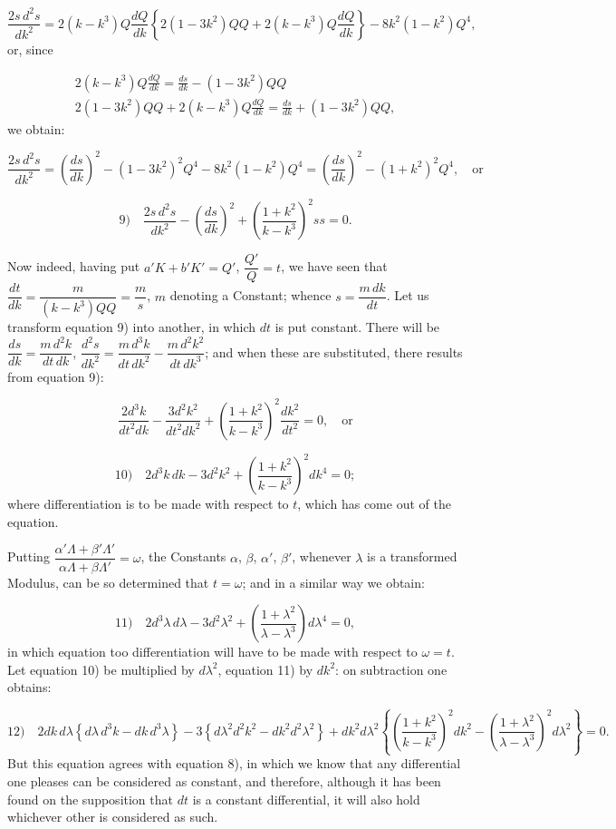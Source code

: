 \documentclass{article}
\begin{document}
\[
\frac{2s\,d^{2}s}{dk^{2}}=2(k-k^{3})Q\frac{dQ}{dk}\left\{2(1-3k^{2})QQ+2(k-k^{3})Q\frac{dQ}{dk}\right\}-8k^{2}(1-k^{2})Q^{4},
\]
or, since

\[
\begin{gathered}
2(k-k^{3})Q\frac{dQ}{dk}=\frac{ds}{dk}-(1-3k^{2})QQ\\[1.5ex]
2(1-3k^{2})QQ+2(k-k^{3})Q\frac{dQ}{dk}=\frac{ds}{dk}+(1-3k^{2})QQ,
\end{gathered}
\]
we obtain:

\[
\frac{2s\,d^{2}s}{dk^{2}}=\left(\frac{ds}{dk}\right)^{2}-(1-3k^{2})^{2}Q^{4}-8k^{2}(1-k^{2})Q^{4}=\left(\frac{ds}{dk}\right)^{2}-(1+k^{2})^{2}Q^{4},\quad\text{or}
\]

\[
\text{9)}\quad\frac{2s\,d^{2}s}{dk^{2}}-\left(\frac{ds}{dk}\right)^{2}+\left(\frac{1+k^{2}}{k-k^{3}}\right)^{2}ss=0.
\]

Now indeed, having put $a'K+b'K'=Q'$, $\dfrac{Q'}{Q}=t$, we have seen that $\dfrac{dt}{dk}=\dfrac{m}{(k-k^{3})QQ}=\dfrac{m}{s}$, $m$ denoting a Constant; whence $s=\dfrac{m\,dk}{dt}$. Let us transform equation 9) into another, in which $dt$ is put constant. There will be $\dfrac{ds}{dk}=\dfrac{m\,d^{2}k}{dt\,dk}$, $\dfrac{d^{2}s}{dk^{2}}=\dfrac{m\,d^{3}k}{dt\,dk^{2}}-\dfrac{m\,d^{2}k^{2}}{dt\,dk^{3}}$; and when these are substituted, there results from equation 9):

\[
\frac{2d^{3}k}{dt^{2}dk}-\frac{3d^{2}k^{2}}{dt^{2}dk^{2}}+\left(\frac{1+k^{2}}{k-k^{3}}\right)^{2}\frac{dk^{2}}{dt^{2}}=0,\quad\text{or}
\]

\[
\text{10)}\quad2d^{3}k\,dk-3d^{2}k^{2}+\left(\frac{1+k^{2}}{k-k^{3}}\right)^{2}dk^{4}=0;
\]
where differentiation is to be made with respect to $t$, which has come out of the equation.

Putting $\dfrac{\alpha'\Lambda+\beta'\Lambda'}{\alpha\Lambda+\beta\Lambda'}=\omega$, the Constants $\alpha$, $\beta$, $\alpha'$, $\beta'$, whenever $\lambda$ is a transformed Modulus, can be so determined that $t=\omega$; and in a similar way we obtain:

\[
\text{11)}\quad2d^{3}\lambda\,d\lambda-3d^{2}\lambda^{2}+\left(\frac{1+\lambda^{2}}{\lambda-\lambda^{3}}\right)d\lambda^{4}=0,
\]
in which equation too differentiation will have to be made with respect to $\omega=t$. Let equation 10) be multiplied by $d\lambda^{2}$, equation 11) by $dk^{2}$: on subtraction one obtains:

\[
\text{12)}\quad2dk\,d\lambda\left\{d\lambda\,d^{3}k-dk\,d^{3}\lambda\right\}-3\left\{d\lambda^{2}d^{2}k^{2}-dk^{2}d^{2}\lambda^{2}\right\}+dk^{2}d\lambda^{2}\left\{\left(\frac{1+k^{2}}{k-k^{3}}\right)^{2}dk^{2}-\left(\frac{1+\lambda^{2}}{\lambda-\lambda^{3}}\right)^{2}d\lambda^{2}\right\}=0.
\]
But this equation agrees with equation 8), in which we know that any differential one pleases can be considered as constant, and therefore, although it has been found on the supposition that $dt$ is a constant differential, it will also hold whichever other is considered as such.
\end{document}
